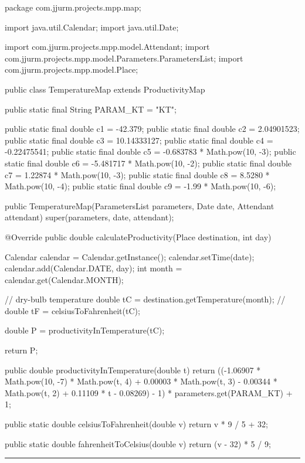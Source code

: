 \begin{javacode}
package com.jjurm.projects.mpp.map;

import java.util.Calendar;
import java.util.Date;

import com.jjurm.projects.mpp.model.Attendant;
import com.jjurm.projects.mpp.model.Parameters.ParametersList;
import com.jjurm.projects.mpp.model.Place;

public class TemperatureMap extends ProductivityMap {

  public static final String PARAM_KT = "KT";

  public static final double c1 = -42.379;
  public static final double c2 = 2.04901523;
  public static final double c3 = 10.14333127;
  public static final double c4 = -0.22475541;
  public static final double c5 = -0.683783 * Math.pow(10, -3);
  public static final double c6 = -5.481717 * Math.pow(10, -2);
  public static final double c7 = 1.22874 * Math.pow(10, -3);
  public static final double c8 = 8.5280 * Math.pow(10, -4);
  public static final double c9 = -1.99 * Math.pow(10, -6);

  public TemperatureMap(ParametersList parameters, Date date, Attendant attendant) {
    super(parameters, date, attendant);
  }

  @Override
  public double calculateProductivity(Place destination, int day) {
    Calendar calendar = Calendar.getInstance();
    calendar.setTime(date);
    calendar.add(Calendar.DATE, day);
    int month = calendar.get(Calendar.MONTH);

    // dry-bulb temperature
    double tC = destination.getTemperature(month);
    // double tF = celsiusToFahrenheit(tC);

    double P = productivityInTemperature(tC);

    return P;
  }

  public double productivityInTemperature(double t) {
    return ((-1.06907 * Math.pow(10, -7) * Math.pow(t, 4) + 0.00003 * Math.pow(t, 3)
        - 0.00344 * Math.pow(t, 2) + 0.11109 * t - 0.08269) - 1) * parameters.get(PARAM_KT) + 1;
  }

  public static double celsiusToFahrenheit(double v) {
    return v * 9 / 5 + 32;
  }

  public static double fahrenheitToCelsius(double v) {
    return (v - 32) * 5 / 9;
  }

}
\end{javacode}

\noindent\rule{\textwidth}{0.4pt}

